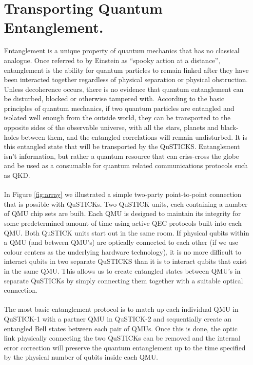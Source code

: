 \documentclass[aps,prl,twocolumn,10pt,nofootinbib]{revtex4}
\begin{document}
\section{Transporting Quantum Entanglement.}
Entanglement is a unique property of quantum mechanics that has no classical analogue.  Once referred to by Einstein as ``spooky action at a distance'', entanglement is the ability for quantum particles to remain linked after they have been interacted together regardless of physical separation or physical obstruction.  Unless decoherence occurs, there is no evidence that quantum entanglement can be disturbed, blocked or otherwise tampered with.  According to the basic principles of quantum mechanics, if two quantum particles are entangled and isolated well enough from the outside world, they can be transported to the opposite sides of the observable universe, with all the stars, planets and black-holes between them, and the entangled correlations will remain undisturbed.  It is this entangled state that will be transported by the QuSTICKS. Entanglement isn't information, but rather a quantum resource that can criss-cross the globe and be used as a consumable for quantum related communications protocols such as QKD.  
\\
\\
In Figure \ref{fig:array} we illustrated a simple two-party point-to-point connection that is possible with QuSTICKs.  Two QuSTICK units, each containing a number of QMU chip sets are built.  Each QMU is designed to maintain its integrity for some predetermined amount of time using active QEC protocols built into each QMU.  Both QuSTICK units start out in the same room.  If physical qubits within a QMU (and between QMU's) are optically connected to each other (if we use colour centers as the underlying hardware technology), it is no more difficult to interact qubits in two separate QuSTICKS than it is to interact qubits that exist in the same QMU.  This allows us to create entangled states between QMU's in separate QuSTICKs by simply connecting them together with a suitable optical connection.  
\\
\\
The most basic entanglement protocol is to match up each individual QMU in QuSTICK-1 with a partner QMU in QuSTICK-2 and sequentially create an entangled Bell states between each pair of QMUs.  Once this is done, the optic link physically connecting the two QuSTICKs can be removed and the internal error correction will preserve the quantum entanglement up to the time specified by the physical number of qubits inside each QMU.
\end{document}
